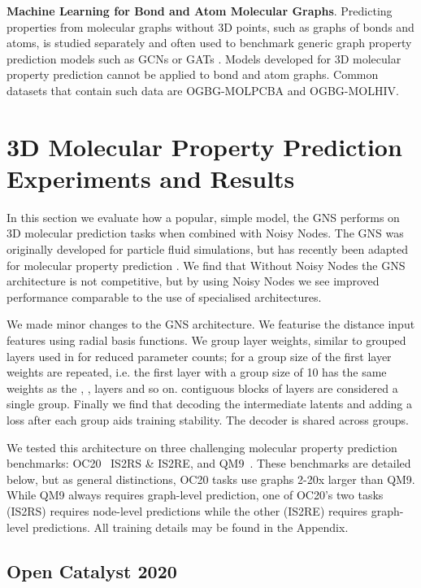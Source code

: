 \documentclass{article} \usepackage{iclr2022_conference,times}
\begin{document}
\textbf{Machine Learning for Bond and Atom Molecular Graphs}. Predicting properties from molecular graphs without 3D points, such as graphs of bonds and atoms, is studied separately and often used to benchmark generic graph property prediction models such as GCNs \citep{Hu2020OpenGB} or GATs \citep{Velickovic2018graph}. Models developed for 3D molecular property prediction cannot be applied to bond and atom graphs. Common datasets that contain such data are OGBG-MOLPCBA and OGBG-MOLHIV. 


\section{3D Molecular Property Prediction Experiments and Results}\label{evaluation}

In this section we evaluate how a popular, simple model, the GNS \citep{pmlr-v119-sanchez-gonzalez20a} performs on 3D molecular prediction tasks when combined with Noisy Nodes. The GNS was originally developed for particle fluid simulations, but has recently been adapted for molecular property prediction \citep{Hu2021ForceNetAG}. We find that Without Noisy Nodes the GNS architecture is not competitive, but by using Noisy Nodes we see improved performance comparable to the use of specialised architectures.

We made minor changes to the GNS architecture. We featurise the distance input features using radial basis functions. We group layer weights, similar to grouped layers used in \cite{Jumper2021HighlyAP} for reduced parameter counts; for a group size of  the first  layer weights are repeated, i.e. the first layer with a group size of 10 has the same weights as the , ,  layers and so on.  contiguous blocks of layers are considered a single group. Finally we find that decoding the intermediate latents and adding a loss after each group aids training stability. The decoder is shared across groups.

We tested this architecture on three challenging molecular property prediction benchmarks:  OC20~\citep{Chanussot2020TheOC} IS2RS \& IS2RE, and QM9~\citep{Ramakrishnan2014QuantumCS}. These benchmarks are detailed below, but as general distinctions, OC20 tasks use graphs 2-20x larger than QM9. While QM9 always requires graph-level prediction, one of OC20's two tasks (IS2RS) requires node-level predictions while the other (IS2RE) requires graph-level predictions. All training details may be found in the Appendix.

\subsection{Open Catalyst 2020}\label{eval-oc}
\end{document}
